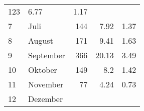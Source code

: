 \begin{longtable}{lXrrr}
       \num{123} &
       \num[round-mode=places,round-precision=2]{6,77} &
         \num[round-mode=places,round-precision=2]{1,17} \\

     7 &
     \multicolumn{1}{X}{ Juli   } &


       \num{144} &
       \num[round-mode=places,round-precision=2]{7,92} &
         \num[round-mode=places,round-precision=2]{1,37} \\

     8 &
     \multicolumn{1}{X}{ August   } &


       \num{171} &
       \num[round-mode=places,round-precision=2]{9,41} &
         \num[round-mode=places,round-precision=2]{1,63} \\

     9 &
     \multicolumn{1}{X}{ September   } &


       \num{366} &
       \num[round-mode=places,round-precision=2]{20,13} &
         \num[round-mode=places,round-precision=2]{3,49} \\

     10 &
     \multicolumn{1}{X}{ Oktober   } &


       \num{149} &
       \num[round-mode=places,round-precision=2]{8,2} &
         \num[round-mode=places,round-precision=2]{1,42} \\

     11 &
     \multicolumn{1}{X}{ November   } &


       \num{77} &
       \num[round-mode=places,round-precision=2]{4,24} &
         \num[round-mode=places,round-precision=2]{0,73} \\

     12 &
     \multicolumn{1}{X}{ Dezember   } &



\end{longtable}
